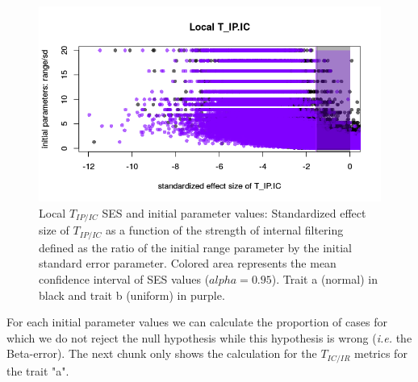 \documentclass[12pt]{article}\usepackage[]{graphicx}\usepackage[]{color}
\makeatletter
\def\maxwidth{ %
  \ifdim\Gin@nat@width>\linewidth
    \linewidth
  \else
    \Gin@nat@width
  \fi
}
\newenvironment{knitrout}{}{} %
\makeatother
\begin{document}
\begin{knitrout}
\begin{figure}
{\centering \includegraphics[width=\maxwidth]{figure/In_filter_results_plot_initparam-1} 

}

\caption[Local $T_{IP/IC}$ SES and initial parameter values]{Local $T_{IP/IC}$ SES and initial parameter values: Standardized effect size of $T_{IP/IC}$ as a function of the strength of internal filtering defined as the ratio of the initial range parameter by the initial standard error parameter. Colored area represents the mean confidence interval of SES values ($alpha = 0.95$). Trait a (normal) in black and trait b (uniform) in purple.}\label{fig:In_filter_results_plot_initparam}
\end{figure}


\end{knitrout}
 
  
For each initial parameter values we can calculate the proportion of cases for which we do not reject the null hypothesis while this hypothesis is wrong (\textit{i.e.} the Beta-error). The next chunk only shows the calculation for the $T_{IC/IR}$ metrics for the trait "a".
\end{document}
